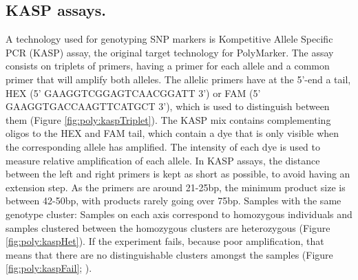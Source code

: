 \subsection{KASP assays.}
A technology used for genotyping SNP markers is Kompetitive Allele Specific PCR (KASP) assay, the original target technology for PolyMarker.
The assay consists on triplets of primers, having a primer for each allele and a common primer that will amplify both alleles. 
The allelic primers have at the 5'-end a tail, HEX (5' GAAGGTCGGAGTCAACGGATT 3') or FAM (5' GAAGGTGACCAAGTTCATGCT 3'), which is used to distinguish between them (Figure \ref{fig:poly:kaspTriplet}). 
The KASP mix contains complementing oligos to the HEX and FAM tail, which contain a dye that is only visible when the corresponding allele has amplified. 
The intensity of each dye is used to measure relative amplification of each allele. 
In KASP assays, the distance between the left and right primers is kept as short as possible, to avoid having an extension step. 
As the primers are around 21-25bp, the minimum product size is between 42-50bp, with products rarely going over 75bp.  
Samples with the same genotype cluster: Samples on each axis correspond to homozygous individuals and samples clustered between the homozygous clusters are heterozygous (Figure \ref{fig:poly:kaspHet}). 
If the experiment fails, because poor amplification, that means that there are no distinguishable clusters amongst the samples (Figure \ref{fig:poly:kaspFail}; \citealt{LGC}).



